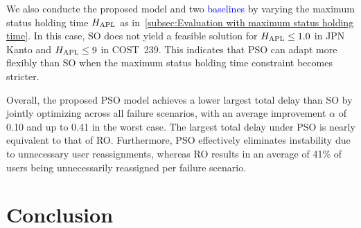 \documentclass[10pt, letterpaper]{IEEEtran}
\newcommand\blue[1]{\textcolor{blue}{#1}}
\begin{document}
\begin{CJK}{UTF8}{ipxm}
We also conducte the proposed model and two \blue{baselines} by varying the maximum status holding time $H_{\rm APL}$ as in~\ref{subsec:Evaluation with maximum status holding time}.
In this case, SO does not yield a feasible solution for $H_{\rm APL} \leq 1.0$ in JPN Kanto and $H_{\rm APL} \leq 9$ in COST~239.
This indicates that PSO can adapt more flexibly than SO when the maximum status holding time constraint becomes stricter.

Overall, the proposed PSO model achieves a lower largest total delay than SO by jointly optimizing across all failure scenarios, with an average improvement $\alpha$ of 0.10 and up to 0.41 in the worst case.
The largest total delay under PSO is nearly equivalent to that of RO.
Furthermore, PSO effectively eliminates instability due to unnecessary user reassignments, whereas RO results in an average of 41\% of users being unnecessarily reassigned per failure scenario.

\section{Conclusion}
\label{sec:conclusion}



\end{CJK}
\end{document}

